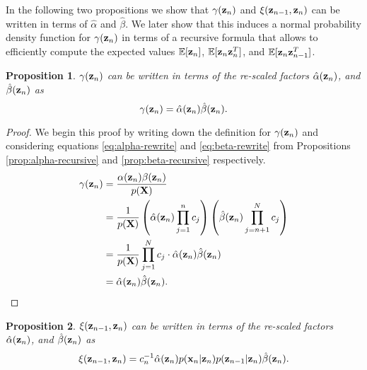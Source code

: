 \documentclass[11pt]{article}
\numberwithin{equation}{section}
\newcommand{\x}{{\bf x}}
\newcommand{\z}{{\bf z}}
\newtheorem{proposition}{Proposition}[section]
\begin{document}
In the following two propositions we show that $\gamma(\z_n)$ and $\xi(\z_{n-1}, \z_{n})$ can be written in terms of $\hat\alpha$ and $\hat\beta$. We later show that this induces a normal probability density function for $\gamma(\z_n)$ in terms of a recursive formula that allows to efficiently compute the expected values $\mathbb{E}[\z_n]$, $\mathbb{E}[\z_n\z_{n}^{T}]$, and  $\mathbb{E}[\z_n\z_{n-1}^{T}]$.


\begin{proposition}\label{prop:gamma-rewrite-scaled}
	$\gamma(\z_n)$ can be written in terms of the re-scaled factors $\hat\alpha(\z_n)$, and $\hat\beta(\z_n)$ as
	\begin{equation}
		\gamma(\z_n) = \hat\alpha(\z_n)\hat\beta(\z_n).
	\end{equation}
\end{proposition}

\begin{proof} We begin this proof by writing down the definition for $\gamma(\z_n)$ and considering equations \eqref{eq:alpha-rewrite} and \eqref{eq:beta-rewrite} from Propositions \ref{prop:alpha-recursive} and \ref{prop:beta-recursive} respectively.
	\begin{align}
		\gamma(\z_n) &= \frac{\alpha(\z_n) \beta(\z_n)}{p({\bf X})} \\
		&= \frac{1}{p({\bf X})}\left(\hat\alpha(\z_n) \prod_{j=1}^n c_j\right)\left(\hat\beta(\z_n) \prod_{j={n+1}}^N c_j\right) \\
		&= \frac{1}{p(\bf X)} \prod_{j=1}^N c_j \cdot \hat\alpha(\z_n) \hat\beta(\z_n)\\
		&= \hat\alpha(\z_n) \hat\beta(\z_n).
	\end{align}
\end{proof}

\begin{proposition} \label{prop:xi-rewrite}
	$\xi(\z_{n-1}, \z_n)$ can be written in terms of the re-scaled factors $\hat\alpha(\z_n)$, and $\hat\beta(\z_n)$ as
	\begin{equation}
		\xi(\z_{n-1}, \z_{n}) = c_n^{-1}\hat\alpha(\z_n)p(\x_n \vert \z_n) p(\z_{n-1}\vert \z_n)\hat\beta(\z_n).
	\end{equation}
\end{proposition}
\end{document}
